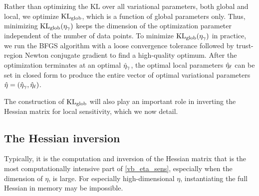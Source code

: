 Rather than optimizing the $\mathrm{KL}$ over all variational parameters, both global and local,
we optimize $\mathrm{KL}_{\mathrm{glob}}$, which is a function of global parameters only.
Thus, minimizing $\mathrm{KL}_{\mathrm{glob}}(\eta_{\gamma})$ keeps the
dimension of the optimization parameter independent of the number of data points.
To minimize $\mathrm{KL}_{\mathrm{glob}}(\eta_{\gamma})$ in practice,
we run the BFGS algorithm with a loose convergence tolerance
followed by trust-region Newton conjugate gradient \citep[Chapter~7]{nocedal:2006:numerical}
to find a high-quality optimum.
After the optimization terminates at an optimal $\hat\eta_{\gamma}$,
the optimal local parameters $\hat\eta_{\ell}$ can be set in closed form
to produce the entire vector of optimal variational parameters $\hat\eta = (\hat\eta_{\gamma}, \hat\eta_{\ell})$.

The construction of $\mathrm{KL}_{\mathrm{glob}}$ will also play an
important role in inverting the Hessian matrix for local sensitivity,
which we now detail.





\subsection{The Hessian inversion}

Typically, it is the computation and inversion of the Hessian matrix that is
the most computationally intensive part of \eqref{vb_eta_sens}, especially when
the dimension of $\eta$, is large.
For especially high-dimensional $\eta$,
instantiating the full Hessian in memory
may be impossible.

